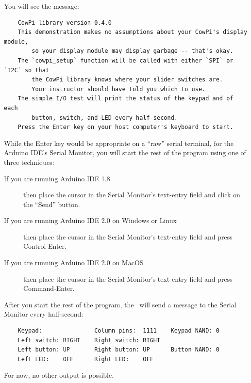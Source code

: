 \begin{description}
\end{description}
You will see the message:

\begin{verbatim}
    CowPi library version 0.4.0
    This demonstration makes no assumptions about your CowPi's display module,
        so your display module may display garbage -- that's okay.
    The `cowpi_setup` function will be called with either `SPI` or `I2C` so that
        the CowPi library knows where your slider switches are.
        Your instructor should have told you which to use.
    The simple I/O test will print the status of the keypad and of each
        button, switch, and LED every half-second.
    Press the Enter key on your host computer's keyboard to start.
\end{verbatim}

While the Enter key would be appropriate on a ``raw'' serial terminal, for the Arduino IDE's Serial Monitor, you will start the rest of the program using one of three techniques:
\begin{description}
    \item[If you are running Arduino IDE 1.8] then place the cursor in the Serial Monitor's text-entry field and click on the ``Send'' button.
    \item[If you are running Arduino IDE 2.0 on Windows or Linux] then place the cursor in the Serial Monitor's text-entry field and press Control-Enter.
    \item[If you are running Arduino IDE 2.0 on MacOS] then place the cursor in the Serial Monitor's text-entry field and press Command-Enter.
\end{description}

After you start the rest of the program, the \developmentboard\ will send a message to the Serial Monitor every half-second:

\begin{verbatim}
    Keypad:               Column pins:  1111    Keypad NAND: 0
    Left switch: RIGHT    Right switch: RIGHT
    Left button: UP       Right button: UP      Button NAND: 0
    Left LED:    OFF      Right LED:    OFF
\end{verbatim}

For now, no other output is possible.

